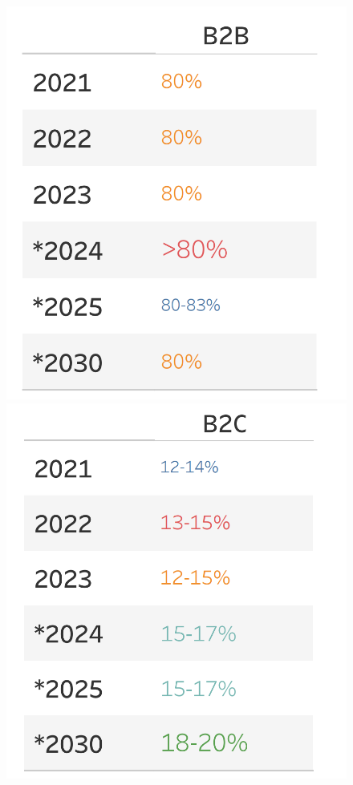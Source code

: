 \documentclass[12pt]{ctexart}
\begin{document}
\begin{figure}[htbp!]
    \centering
    \begin{minipage}{0.27\textwidth}
        \centering
        \includegraphics[width=\textwidth]{Images/111_00.png}
    \end{minipage}
    \hfill
    \begin{minipage}{0.27\textwidth}
        \centering
        \includegraphics[width=\textwidth]{Images/222_00.png}

\end{minipage}
\end{figure}
\end{document}
